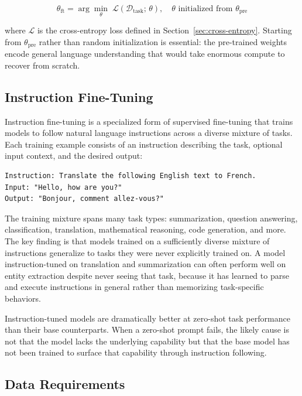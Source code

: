 \documentclass{book}
\begin{document}
\begin{equation}
\label{eq:finetune}
\theta_{\text{ft}} = \arg\min_{\theta}\; \mathcal{L}(\mathcal{D}_{\text{task}};\, \theta),
\quad \theta \text{ initialized from } \theta_{\text{pre}}
\end{equation}

where $\mathcal{L}$ is the cross-entropy loss defined in
Section~\ref{sec:cross-entropy}. Starting from $\theta_{\text{pre}}$ rather
than random initialization is essential: the pre-trained weights encode
general language understanding that would take enormous compute to recover
from scratch.

\subsection{Instruction Fine-Tuning}
\label{sec:instruction_finetuning}

Instruction fine-tuning is a specialized form of supervised fine-tuning
that trains models to follow natural language instructions across a diverse
mixture of tasks. Each training example consists of an instruction
describing the task, optional input context, and the desired output:

\begin{verbatim}
Instruction: Translate the following English text to French.
Input: "Hello, how are you?"
Output: "Bonjour, comment allez-vous?"
\end{verbatim}

The training mixture spans many task types: summarization, question
answering, classification, translation, mathematical reasoning, code
generation, and more. The key finding is that models trained on a
sufficiently diverse mixture of instructions generalize to tasks they
were never explicitly trained on. A model instruction-tuned on translation
and summarization can often perform well on entity extraction despite
never seeing that task, because it has learned to parse and execute
instructions in general rather than memorizing task-specific behaviors.

Instruction-tuned models are dramatically better at zero-shot task
performance than their base counterparts. When a zero-shot prompt fails,
the likely cause is not that the model lacks the underlying capability
but that the base model has not been trained to surface that capability
through instruction following.

\subsection{Data Requirements}
\label{sec:sft_data}
\end{document}

